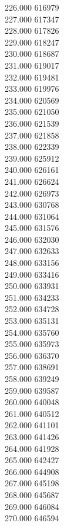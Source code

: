{ 226.000	616979 \\
 227.000	617347 \\
 228.000	617826 \\
 229.000	618247 \\
 230.000	618687 \\
 231.000	619017 \\
 232.000	619481 \\
 233.000	619976 \\
 234.000	620569 \\
 235.000	621050 \\
 236.000	621539 \\
 237.000	621858 \\
 238.000	622339 \\
 239.000	625912 \\
 240.000	626161 \\
 241.000	626624 \\
 242.000	626973 \\
 243.000	630768 \\
 244.000	631064 \\
 245.000	631576 \\
 246.000	632030 \\
 247.000	632633 \\
 248.000	633156 \\
 249.000	633416 \\
 250.000	633931 \\
 251.000	634233 \\
 252.000	634728 \\
 253.000	635131 \\
 254.000	635760 \\
 255.000	635973 \\
 256.000	636370 \\
 257.000	638691 \\
 258.000	639249 \\
 259.000	639587 \\
 260.000	640048 \\
 261.000	640512 \\
 262.000	641101 \\
 263.000	641426 \\
 264.000	641928 \\
 265.000	642427 \\
 266.000	644908 \\
 267.000	645198 \\
 268.000	645687 \\
 269.000	646084 \\
 270.000	646594 \\
}

